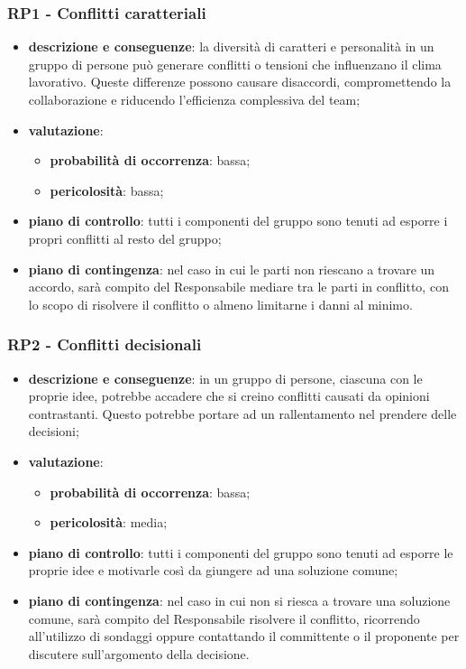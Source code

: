     \subsubsection{RP1 - Conflitti caratteriali} \label{sec:RP1}
        \begin{itemize}
            \item \textbf{descrizione e conseguenze}: la diversità di caratteri e personalità in un gruppo di persone può generare conflitti o tensioni che influenzano il clima lavorativo. Queste differenze possono causare disaccordi, compromettendo la collaborazione e riducendo l'efficienza complessiva del team;
            \item \textbf{valutazione}:
            \begin{itemize} 
                \item \textbf{probabilità di occorrenza}: bassa;
                \item \textbf{pericolosità}: bassa;
            \end{itemize}
            \item \textbf{piano di controllo}: tutti i componenti del gruppo sono tenuti ad esporre i propri conflitti al resto del gruppo;
            \item \textbf{piano di contingenza}: nel caso in cui le parti non riescano a trovare un accordo, sarà compito del Responsabile mediare tra le parti in conflitto, con lo scopo di risolvere il conflitto o almeno limitarne i danni al minimo.
        \end{itemize}
        
    \subsubsection{RP2 - Conflitti decisionali} \label{sec:RP2}
        \begin{itemize}
            \item \textbf{descrizione e conseguenze}: in un gruppo di persone, ciascuna con le proprie idee, potrebbe accadere che si creino conflitti causati da opinioni contrastanti. Questo potrebbe portare ad un rallentamento nel prendere delle decisioni;
            \item \textbf{valutazione}:
            \begin{itemize} 
                \item \textbf{probabilità di occorrenza}: bassa;
                \item \textbf{pericolosità}: media;
            \end{itemize}
            \item \textbf{piano di controllo}: tutti i componenti del gruppo sono tenuti ad esporre le proprie idee e motivarle così da giungere ad una soluzione comune;
            \item \textbf{piano di contingenza}: nel caso in cui non si riesca a trovare una soluzione comune, sarà compito del Responsabile risolvere il conflitto, ricorrendo all’utilizzo di sondaggi oppure contattando il committente o il proponente per discutere sull'argomento della decisione.               
        \end{itemize}
        
